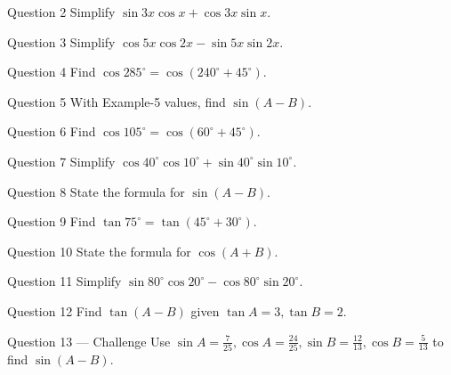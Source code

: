 \documentclass[11pt]{article}
\begin{document}
\begin{qbox}{Question 2}
Simplify $\sin 3x\cos x+\cos 3x\sin x$.\workspace{2.4cm}
\end{qbox}

\begin{qbox}{Question 3}
Simplify $\cos 5x\cos 2x-\sin 5x\sin 2x$.\workspace{2.4cm}
\end{qbox}

\begin{qbox}{Question 4}
Find $\cos 285^\circ=\cos(240^\circ+45^\circ)$.\workspace{2.4cm}
\end{qbox}

\begin{qbox}{Question 5}
With Example-5 values, find $\sin(A-B)$.\workspace{2.4cm}
\end{qbox}

\begin{qbox}{Question 6}
Find $\cos 105^\circ=\cos(60^\circ+45^\circ)$.\workspace{2.4cm}
\end{qbox}

\begin{qbox}{Question 7}
Simplify $\cos40^\circ\cos10^\circ+\sin40^\circ\sin10^\circ$.\workspace{2.4cm}
\end{qbox}

\begin{qbox}{Question 8}
State the formula for $\sin(A-B)$.\workspace{2.4cm}
\end{qbox}

\begin{qbox}{Question 9}
Find $\tan 75^\circ=\tan(45^\circ+30^\circ)$.\workspace{2.4cm}
\end{qbox}

\begin{qbox}{Question 10}
State the formula for $\cos(A+B)$.\workspace{2.4cm}
\end{qbox}

\begin{qbox}{Question 11}
Simplify $\sin80^\circ\cos20^\circ-\cos80^\circ\sin20^\circ$.\workspace{2.4cm}
\end{qbox}

\begin{qbox}{Question 12}
Find $\tan(A-B)$ given $\tan A=3,\tan B=2$.\workspace{2.4cm}
\end{qbox}

\begin{qbox}{Question 13 --- Challenge}
Use $\sin A=\tfrac7{25},\cos A=\tfrac{24}{25},\sin B=\tfrac{12}{13},\cos B=\tfrac5{13}$ to find $\sin(A-B)$.\workspace{3cm}
\end{qbox}
\end{document}
